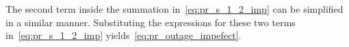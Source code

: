 \documentclass[12pt,draftcls,peerreview,onecolumn]{IEEEtran}
\begin{document}
The second term inside the summation in~\eqref{eq:pr_s_1_2_imp} can be simplified in a similar manner. Substituting the expressions for these two terms in~\eqref{eq:pr_s_1_2_imp} yields~\eqref{eq:pr_outage_impefect}.
 





%
\end{document}
